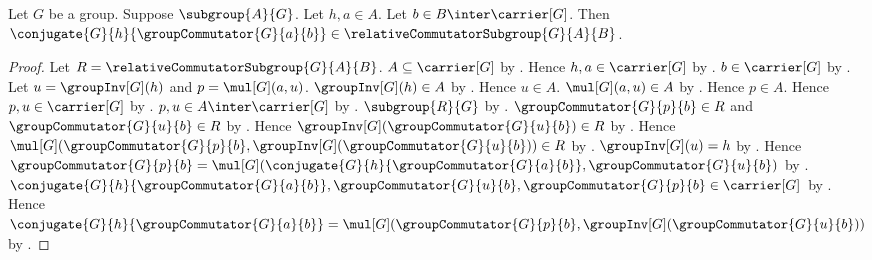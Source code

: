 \begin{lemma}\label{left_subgroup_conjugates_relative_commutator_generator}
    Let $G$ be a group.
    Suppose $\subgroup{A}{G}$.
    Let $h,a\in A$.
    Let $b\in B\inter\carrier[G]$.
    Then
        $\conjugate{G}{h}{\groupCommutator{G}{a}{b}}\in
            \relativeCommutatorSubgroup{G}{A}{B}$.
\end{lemma}
\begin{proof}
    Let $R=\relativeCommutatorSubgroup{G}{A}{B}$.
    $A\subseteq\carrier[G]$ by .
    Hence $h,a\in\carrier[G]$ by .
    $b\in\carrier[G]$ by .
    Let $u=\groupInv[G](h)$ and $p=\mul[G](a,u)$.
    $\groupInv[G](h)\in A$ by .
    Hence $u\in A$.
    $\mul[G](a,u)\in A$ by .
    Hence $p\in A$.
    Hence $p,u\in\carrier[G]$ by .
    $p,u\in A\inter\carrier[G]$ by .
    $\subgroup{R}{G}$ by
        .
    $\groupCommutator{G}{p}{b}\in R$ and
        $\groupCommutator{G}{u}{b}\in R$ by
        .
    Hence $\groupInv[G](\groupCommutator{G}{u}{b})\in R$ by
        .
    Hence
        $\mul[G](
            \groupCommutator{G}{p}{b},
            \groupInv[G](\groupCommutator{G}{u}{b}))\in R$ by
        .
    $\groupInv[G](u)=h$ by
        .
    Hence
        $\groupCommutator{G}{p}{b}=
            \mul[G](
                \conjugate{G}{h}{\groupCommutator{G}{a}{b}},
                \groupCommutator{G}{u}{b})$ by
        .
    $\conjugate{G}{h}{\groupCommutator{G}{a}{b}},
        \groupCommutator{G}{u}{b},
        \groupCommutator{G}{p}{b}\in\carrier[G]$ by
        .
    Hence
        $\conjugate{G}{h}{\groupCommutator{G}{a}{b}}=
            \mul[G](
                \groupCommutator{G}{p}{b},
                \groupInv[G](\groupCommutator{G}{u}{b}))$ by
        .
\end{proof}

